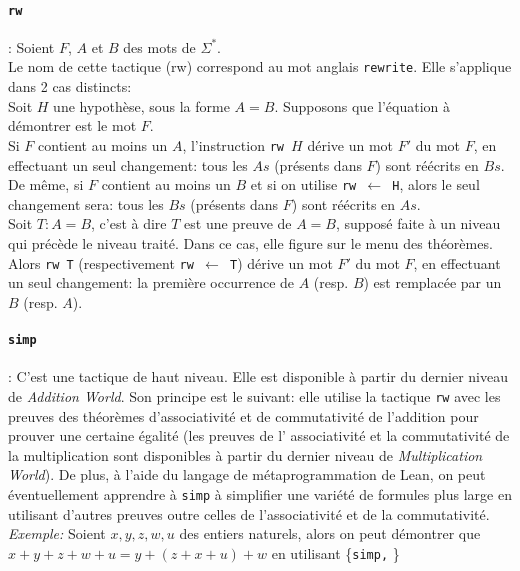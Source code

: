 \paragraph {\texttt{rw}}: Soient $F$, $A$ et $B$ des mots de $\Sigma^*$.\\
Le nom de cette tactique (rw) correspond au mot anglais \texttt{rewrite}. Elle s'applique dans 2 cas distincts:\\
Soit $H$ une hypothèse, sous la forme $A=B$. Supposons que l'équation à démontrer est le mot $F$. \\Si $F$ contient au moins un $A$, l'instruction \texttt{rw $H$} dérive un mot $F'$ du mot $F$, en effectuant un seul changement: tous les $As$ (présents dans $F$) sont réécrits en $Bs$. De même, si $F$ contient au moins un $B$ et si on utilise \texttt{rw $\leftarrow$ H}, alors le seul changement sera: tous les $Bs$ (présents dans $F$) sont réécrits en $As$.\\
Soit $T: A=B$, c'est à dire $T$ est une preuve de $A=B$, supposé faite à un niveau qui précède le niveau traité. Dans ce cas, elle figure sur le menu des théorèmes. Alors \texttt{rw T} (respectivement \texttt{rw $\leftarrow$ T}) dérive un mot $F'$ du mot $F$, en effectuant un seul changement: la première occurrence de $A$ (resp. $B$) est remplacée par un $B$ (resp. $A$). 

\paragraph {\texttt{simp}}: C'est une tactique de haut niveau. Elle est disponible à partir du dernier niveau de \textit{Addition World}. Son principe est le suivant: elle utilise la tactique \texttt{rw} avec les preuves des théorèmes d'associativité et de commutativité de l'addition pour prouver une certaine égalité (les preuves de l' associativité et la commutativité de la multiplication sont disponibles à partir du dernier niveau de \textit{Multiplication World}). De plus, à l'aide du langage de métaprogrammation de Lean, on peut éventuellement apprendre  à \texttt{simp} à simplifier une variété de formules plus large en utilisant d'autres preuves outre celles de l'associativité et de la commutativité.   \\
\textit{Exemple:} Soient $x,y,z,w,u$ des entiers naturels, alors on peut démontrer que $x+y+z+w+u=y+(z+x+u)+w$ en utilisant \big\{\texttt{simp,} \big\}


